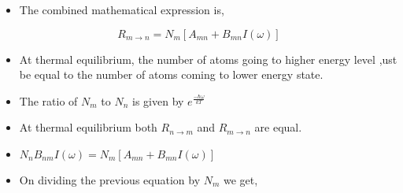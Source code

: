 \documentclass[aspectratio=169]{beamer}
\begin{document}
\begin{frame}{}

	\begin{itemize}
	
		\item The combined mathematical expression is,
		
	\end{itemize}
	
			\begin{equation}
					 R_{m \to n} = N_{m} [A_{mn} + B_{mn} I(\omega)] 
			\end{equation} 
	
\end{frame}

\begin{frame}{}

	\begin{itemize}

		\item At thermal equilibrium, the number of atoms going to higher energy level ,ust be equal to the number of atoms coming to 					  lower energy state. \newline	
		\item The ratio of $ N_{m} $ to $ N_{n} $ is given by $ e^{\frac{-\hbar \omega}{kT}} $  \newline
 
	\end{itemize}
	
\end{frame}

\begin{frame}{}

	\begin{itemize}

		\item At thermal equilibrium both $ R_{n \to m} $ and $ R_{m \to n} $ are equal.  \newline
		\item $ N_{n} B_{nm} I(\omega) = N_{m} [A_{mn} + B_{mn} I(\omega)] $ \newline
		\item On dividing the previous equation by $ N_{m} $ we get, 
		
	\end{itemize}
	
\end{frame}
\end{document}
